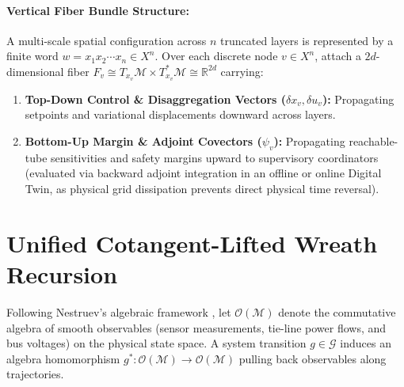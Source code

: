 \documentclass[11pt]{article}
\begin{document}
\paragraph{Vertical Fiber Bundle Structure:}
A multi-scale spatial configuration across $n$ truncated layers is represented by a finite word $w = x_1 x_2 \cdots x_n \in X^n$. Over each discrete node $v \in X^n$, attach a $2d$-dimensional fiber $F_v \cong T_{x_v}\mathcal{M} \times T^*_{x_v}\mathcal{M} \cong \mathbb{R}^{2d}$ carrying:
\begin{enumerate}
    \item \textbf{Top-Down Control \& Disaggregation Vectors ($\delta x_v, \delta u_v$):} Propagating setpoints and variational displacements downward across layers.
    \item \textbf{Bottom-Up Margin \& Adjoint Covectors ($\psi_v$):} Propagating reachable-tube sensitivities and safety margins upward to supervisory coordinators (evaluated via backward adjoint integration in an offline or online Digital Twin, as physical grid dissipation prevents direct physical time reversal).
\end{enumerate}

\section{Unified Cotangent-Lifted Wreath Recursion}

Following Nestruev's algebraic framework \cite{Nestruev2003}, let $\mathcal{O}(\mathcal{M})$ denote the commutative algebra of smooth observables (sensor measurements, tie-line power flows, and bus voltages) on the physical state space. A system transition $g \in \mathcal{G}$ induces an algebra homomorphism $g^* : \mathcal{O}(\mathcal{M}) \to \mathcal{O}(\mathcal{M})$ pulling back observables along trajectories.
\end{document}
